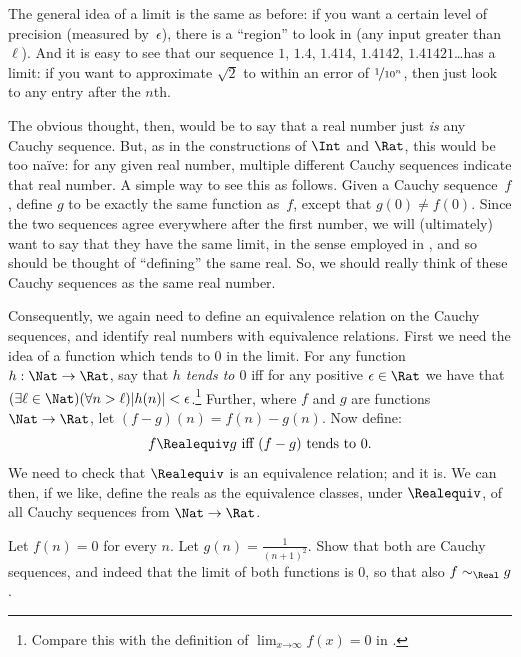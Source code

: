 \documentclass[../../../include/open-logic-section]{subfiles}
\begin{document}
The general idea of a limit is the same as before: if you want a
certain level of precision (measured by~$\epsilon$), there is a
``region'' to look in (any input greater than~$\ell$). And it is easy
to see that our sequence $1$, $1.4$, $1.414$, $1.4142$,
$1.41421$\ldots has a limit: if you want to approximate $\sqrt{2}$ to
within an error of $\nicefrac{1}{10^{n}}$, then just look to any entry
after the $n$th.

The obvious thought, then, would be to say that a real number just
\emph{is} any Cauchy sequence. But, as in the constructions of $\Int$
and $\Rat$, this would be too na\"{i}ve: for any given real number,
multiple different Cauchy sequences indicate that real number. A
simple way to see this as follows. Given a Cauchy sequence~$f$, define
$g$ to be exactly the same function as~$f$, except that $g(0)\neq
f(0)$. Since the two sequences agree everywhere after the first
number, we will (ultimately) want to say that they have the same
limit, in the sense employed in ,
and so should be thought of ``defining'' the same real. So, we should
really think of these Cauchy sequences as the same real number.

Consequently, we again need to define an equivalence relation on the
Cauchy sequences, and identify real numbers with equivalence
relations. First we need the idea of a function which tends to $0$ in
the limit. For any function $h : \Nat \to \Rat$, say that \emph{$h$
tends to $0$} iff for any positive $\epsilon \in \Rat$ we have that
$(\exists \ell \in \Nat)(\forall n > \ell)|h(n)| <
\epsilon$.\footnote{Compare this with the definition of $\lim_{x
\mathord{\rightarrow}\infty}f(x) = 0$ in
.} Further, where $f$ and $g$ are
functions $\Nat \to \Rat$, let $(f-g)(n) = f(n) - g(n)$. Now define:
\[
	f \Realequiv g \text{ iff $(f-g)$ tends to $0$}.
\]
We need to check that $\Realequiv$ is an equivalence relation; and it
is. We can then, if we like, define the reals as the equivalence
classes, under $\Realequiv$, of all Cauchy sequences from $\Nat \to
\Rat$.

\begin{prob}
Let $f(n) = 0$ for every $n$. Let $g(n) = \frac{1}{(n+1)^2}$. Show
that both are Cauchy sequences, and indeed that the limit of both
functions is $0$, so that also $f \sim_\Real g$. 
\end{prob}
\end{document}
